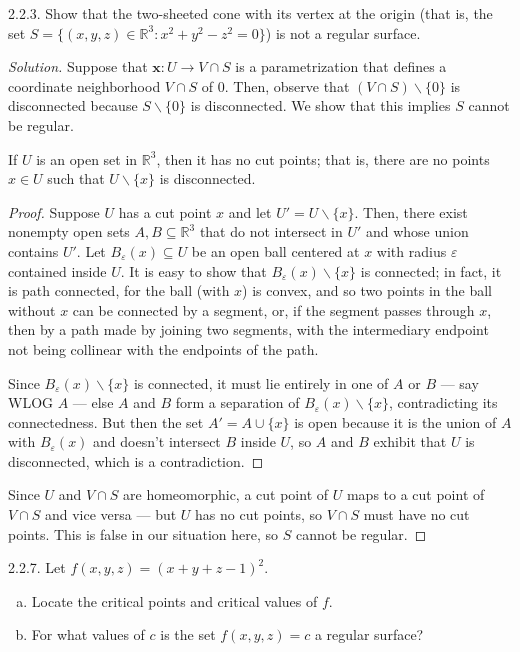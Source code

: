 \documentclass[10pt]{scrartcl}
\providecommand{\eps}{\varepsilon}
\providecommand{\RR}{\mathbb R}
\providecommand{\ii}{\item}
\providecommand{\setdiff}{\smallsetminus}
\providecommand{\mb}[1]{\mathbf{#1}}
\newenvironment{soln}{\begin{proof}[Solution]}{\end{proof}}
\begin{document}
\begin{problem*}2.2.3.
	Show that the two-sheeted cone with its vertex at the origin
	(that is, the set $S = \{(x,y,z)\in\RR^3 : x^2+y^2-z^2=0\}$)
	is not a regular surface.
\end{problem*}

\begin{soln}
	Suppose that $\mb x\colon U\to V\cap S$ is a parametrization
	that defines a coordinate neighborhood
	$V\cap S$ of $0$. Then, observe that $(V\cap S)\setdiff\{0\}$
	is disconnected because $S\setdiff\{0\}$ is disconnected.
	We show that this implies $S$ cannot be regular.
	
	\begin{claim*}
		If $U$ is an open set in $\RR^3$,
		then it has no cut points;
		that is, there are no points $x\in U$ such that
		$U\setdiff\{x\}$ is disconnected.
	\end{claim*}
	\begin{proof}
		Suppose $U$ has a cut point $x$ and let $U' = U\setdiff\{x\}$.
		Then, there exist nonempty open sets $A,B\subseteq\RR^3$
		that do not intersect in $U'$ and whose union contains $U'$.
		Let $B_\eps(x)\subseteq U$ be an open ball centered at $x$
		with radius $\eps$ contained inside $U$. It is easy to show that
		$B_\eps(x)\setdiff\{x\}$ is connected; in fact, it is path connected,
		for the ball (with $x$) is convex, and so two points in
		the ball without $x$ can be connected by a segment, or,
		if the segment passes through $x$, then by a path made by
		joining two segments, with the intermediary endpoint
		not being collinear with the endpoints of the path.
		
		Since $B_\eps(x)\setdiff\{x\}$ is connected,
		it must lie entirely in one of $A$ or $B$ --- say WLOG $A$ --- else
		$A$ and $B$ form a separation of $B_\eps(x)\setdiff\{x\}$,
		contradicting its connectedness.
		But then the set $A' = A\cup \{x\}$ is open
		because it is the union of $A$ with $B_\eps(x)$
		and doesn't intersect $B$ inside $U$, so $A$ and $B$
		exhibit that $U$ is disconnected, which is a contradiction.
	\end{proof}

	Since $U$ and $V\cap S$ are homeomorphic, a cut point of $U$
	maps to a cut point of $V\cap S$ and vice versa ---
	but $U$ has no cut points, so $V\cap S$ must have no cut points.
	This is false in our situation here, so $S$ cannot be regular.
\end{soln}

\begin{problem*}2.2.7.
	Let $f(x,y,z) = (x + y + z - 1)^2$.
	\begin{enumerate}[(a)]
		\ii Locate the critical points and critical values of $f$.
		\ii For what values of $c$ is the set $f(x,y,z) = c$
		a regular surface?
	\end{enumerate}
\end{problem*}
\end{document}
